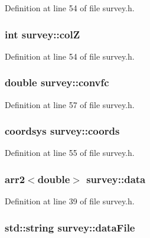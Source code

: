 Definition at line 54 of file survey.h.

\hypertarget{modulesurvey_a8cbaccb2ed0adf76727b20fcdde2d8d3}{
\subsubsection[{colZ}]{\setlength{\rightskip}{0pt plus 5cm}int {\bf survey::colZ}}}
\label{modulesurvey_a8cbaccb2ed0adf76727b20fcdde2d8d3}


Definition at line 54 of file survey.h.

\hypertarget{modulesurvey_a5ecdf494143dc4405d8bfa1bd8aac977}{
\subsubsection[{convfc}]{\setlength{\rightskip}{0pt plus 5cm}double {\bf survey::convfc}}}
\label{modulesurvey_a5ecdf494143dc4405d8bfa1bd8aac977}


Definition at line 57 of file survey.h.

\hypertarget{modulesurvey_ac98a933e4c00622128991d1b60009307}{
\subsubsection[{coords}]{\setlength{\rightskip}{0pt plus 5cm}coordsys {\bf survey::coords}}}
\label{modulesurvey_ac98a933e4c00622128991d1b60009307}


Definition at line 55 of file survey.h.

\hypertarget{modulesurvey_ad31303c9a3c7a5001561118b97890e76}{
\subsubsection[{data}]{\setlength{\rightskip}{0pt plus 5cm}arr2$<$double$>$ {\bf survey::data}}}
\label{modulesurvey_ad31303c9a3c7a5001561118b97890e76}


Definition at line 39 of file survey.h.

\hypertarget{modulesurvey_a6dad0d753c416bddadd0fdb79fc2a6bc}{
\subsubsection[{dataFile}]{\setlength{\rightskip}{0pt plus 5cm}std::string {\bf survey::dataFile}}}
\label{modulesurvey_a6dad0d753c416bddadd0fdb79fc2a6bc}



